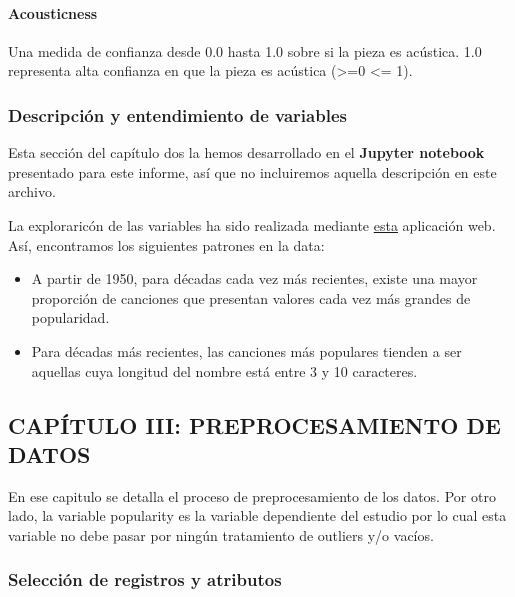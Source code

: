 \documentclass[
  letterpaper,
  DIV=11,
  numbers=noendperiod]{scrartcl}
\providecommand{\tightlist}{%
  \setlength{\itemsep}{0pt}\setlength{\parskip}{0pt}}
\let\oldparagraph\paragraph
\renewcommand{\paragraph}[1]{\oldparagraph{#1}\mbox{}}
\begin{document}
\hypertarget{acousticness}{%
\paragraph{Acousticness}\label{acousticness}}

Una medida de confianza desde 0.0 hasta 1.0 sobre si la pieza es
acústica. 1.0 representa alta confianza en que la pieza es acústica
(\textgreater=0 \textbar{} \textless= 1).

\hypertarget{descripciuxf3n-y-entendimiento-de-variables}{%
\subsubsection{Descripción y entendimiento de
variables}\label{descripciuxf3n-y-entendimiento-de-variables}}

Esta sección del capítulo dos la hemos desarrollado en el
\textbf{Jupyter notebook} presentado para este informe, así que no
incluiremos aquella descripción en este archivo.

La exploraricón de las variables ha sido realizada mediante
\href{https://lucio-cornejo.shinyapps.io/chapter-II-dashboard-INF03/}{esta}
aplicación web. Así, encontramos los siguientes patrones en la data:

\begin{itemize}
\tightlist
\item
  A partir de 1950, para décadas cada vez más recientes, existe una
  mayor proporción de canciones que presentan valores cada vez más
  grandes de popularidad.
\item
  Para décadas más recientes, las canciones más populares tienden a ser
  aquellas cuya longitud del nombre está entre 3 y 10 caracteres.
\end{itemize}

\hypertarget{capuxedtulo-iii-preprocesamiento-de-datos}{%
\subsection{CAPÍTULO III: PREPROCESAMIENTO DE
DATOS}\label{capuxedtulo-iii-preprocesamiento-de-datos}}

En ese capitulo se detalla el proceso de preprocesamiento de los datos.
Por otro lado, la variable popularity es la variable dependiente del
estudio por lo cual esta variable no debe pasar por ningún tratamiento
de outliers y/o vacíos.

\hypertarget{selecciuxf3n-de-registros-y-atributos}{%
\subsubsection{Selección de registros y
atributos}\label{selecciuxf3n-de-registros-y-atributos}}
\end{document}
